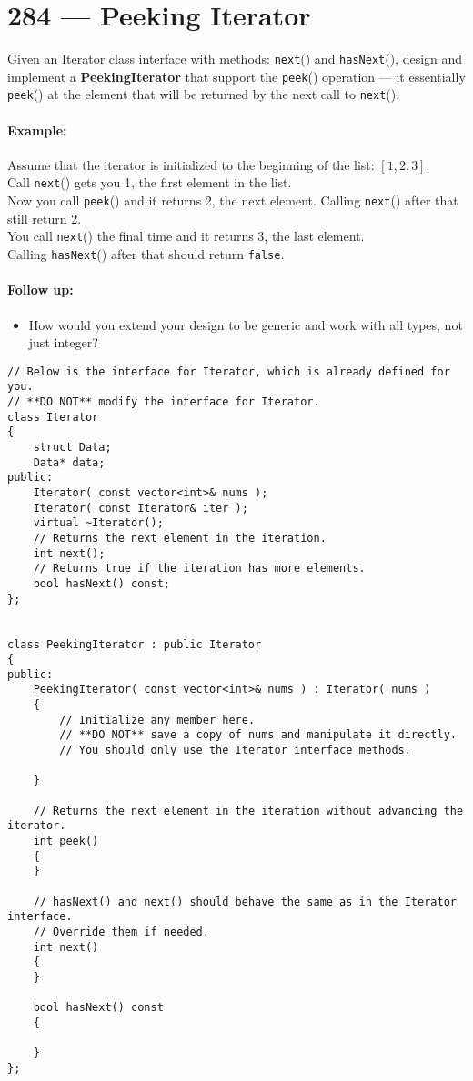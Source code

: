 \section{284 --- Peeking Iterator}
Given an Iterator class interface with methods: \texttt{next}() and \texttt{hasNext}(), design and implement a \textbf{PeekingIterator} that support the \texttt{peek}() operation --- it essentially \texttt{peek}() at the element that will be returned by the next call to \texttt{next}().

\paragraph{Example:}

\begin{flushleft}
Assume that the iterator is initialized to the beginning of the list: $[1,2,3]$.
\\
Call \texttt{next}() gets you 1, the first element in the list.
\\
Now you call \texttt{peek}() and it returns 2, the next element. Calling \texttt{next}() after that still return 2. 
\\
You call \texttt{next}() the final time and it returns 3, the last element. 
\\
Calling \texttt{hasNext}() after that should return \texttt{false}.
\end{flushleft}

\paragraph{Follow up:} 
\begin{itemize}
\item How would you extend your design to be generic and work with all types, not just integer?
\end{itemize}

\setcounter{lstlisting}{0}
\begin{lstlisting}[style=customc,caption={TODO}]
// Below is the interface for Iterator, which is already defined for you.
// **DO NOT** modify the interface for Iterator.
class Iterator
{
    struct Data;
    Data* data;
public:
    Iterator( const vector<int>& nums );
    Iterator( const Iterator& iter );
    virtual ~Iterator();
    // Returns the next element in the iteration.
    int next();
    // Returns true if the iteration has more elements.
    bool hasNext() const;
};


class PeekingIterator : public Iterator
{
public:
    PeekingIterator( const vector<int>& nums ) : Iterator( nums )
    {
        // Initialize any member here.
        // **DO NOT** save a copy of nums and manipulate it directly.
        // You should only use the Iterator interface methods.

    }

    // Returns the next element in the iteration without advancing the iterator.
    int peek()
    {
    }

    // hasNext() and next() should behave the same as in the Iterator interface.
    // Override them if needed.
    int next()
    {
    }

    bool hasNext() const
    {

    }
};
\end{lstlisting}